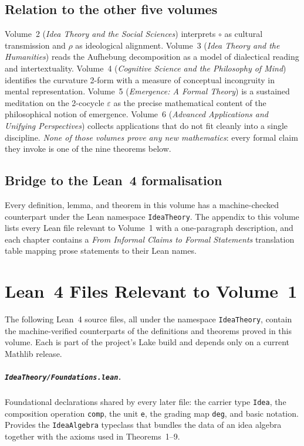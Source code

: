 \documentclass[11pt,oneside]{book}
\begin{document}
\section*{Relation to the other five volumes}
Volume~2 (\emph{Idea Theory and the Social Sciences}) interprets
$\circ$ as cultural transmission and $\rho$ as ideological
alignment. Volume~3 (\emph{Idea Theory and the Humanities}) reads
the Aufhebung decomposition as a model of dialectical reading and
intertextuality. Volume~4 (\emph{Cognitive Science and the
Philosophy of Mind}) identifies the curvature 2-form with a measure
of conceptual incongruity in mental representation. Volume~5
(\emph{Emergence: A Formal Theory}) is a sustained meditation on the
2-cocycle $\varepsilon$ as the precise mathematical content of the
philosophical notion of emergence. Volume~6 (\emph{Advanced
Applications and Unifying Perspectives}) collects applications that
do not fit cleanly into a single discipline. \emph{None of those
volumes prove any new mathematics}: every formal claim they invoke
is one of the nine theorems below.

\section*{Bridge to the Lean~4 formalisation}
Every definition, lemma, and theorem in this volume has a
machine-checked counterpart under the Lean namespace
\texttt{IdeaTheory}. The appendix to this volume lists every Lean
file relevant to Volume~1 with a one-paragraph description, and each
chapter contains a \emph{From Informal Claims to Formal Statements}
translation table mapping prose statements to their Lean names.

\mainmatter




\appendix

\chapter{Lean~4 Files Relevant to Volume~1}
\label{app:lean-vol1}

The following Lean~4 source files, all under the namespace
\texttt{IdeaTheory}, contain the machine-verified counterparts of the
definitions and theorems proved in this volume. Each is part of the
project's Lake build and depends only on a current Mathlib release.

\paragraph{\texttt{IdeaTheory/Foundations.lean}.}
Foundational declarations shared by every later file: the carrier type
\lstinline|Idea|, the composition operation \lstinline|comp|, the unit
\lstinline|e|, the grading map \lstinline|deg|, and basic notation.
Provides the \lstinline|IdeaAlgebra| typeclass that bundles the data of
an idea algebra together with the axioms used in Theorems~1--9.
\end{document}
